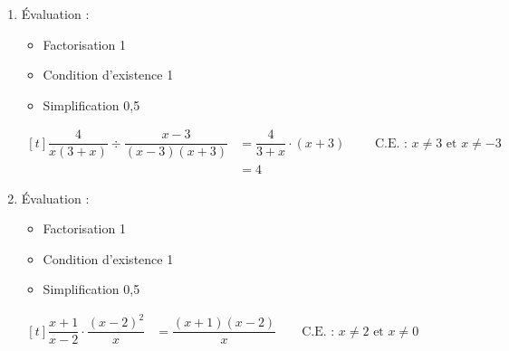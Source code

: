 %
%
    \begin{enumerate}
        \item
              Évaluation :
              \begin{itemize}
                  \item Factorisation \hfill 1
                  \item Condition d'existence \hfill 1
                  \item Simplification \hfill 0,5
              \end{itemize}
              $\begin{aligned}[t]
                      \dfrac{4}{x(3+x)}\div\dfrac{x-3}{(x-3)(x+3)} & = \dfrac{4}{3+x}\cdot (x+3)
                      \qquad\text{ C.E. : }x\ne 3\text{ et } x\ne -3                             \\
                                                                   & = 4
                  \end{aligned}$
        \item
              Évaluation :
              \begin{itemize}
                  \item Factorisation \hfill 1
                  \item Condition d'existence \hfill 1
                  \item Simplification \hfill 0,5
              \end{itemize}
              $\begin{aligned}[t]
                      \dfrac{x+1}{x-2} \cdot \dfrac{(x-2)^2}{x}
                       & = \dfrac{(x+1)(x-2)}{x}\qquad\text{C.E. : }x\ne 2 \text{ et } x \ne 0 \\
                  \end{aligned}$
    \end{enumerate}
